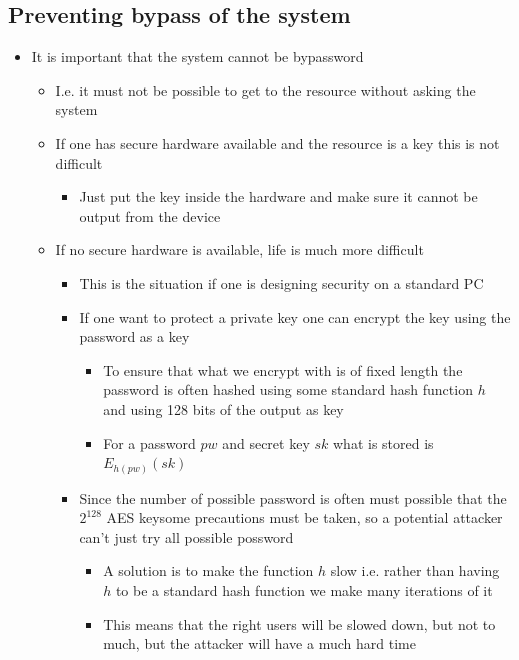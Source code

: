 \documentclass[11pt]{article}
\begin{document}
\subsection{Preventing bypass of the system}
\label{sec:orgcf8e36b}
\begin{itemize}
\item It is important that the system cannot be bypassword
\begin{itemize}
\item I.e. it must not be possible to get to the resource without asking the system
\item If one has secure hardware available and the resource is a key this is not difficult
\begin{itemize}
\item Just put the key inside the hardware and make sure it cannot be output from the device
\end{itemize}
\item If no secure hardware is available, life is much more difficult
\begin{itemize}
\item This is the situation if one is designing security on a standard PC
\item If one want to protect a private key one can encrypt the key using the password as a key
\begin{itemize}
\item To ensure that what we encrypt with is of fixed length the password is often hashed using some standard hash function \(h\) and using 128 bits of the output as key
\item For a password \(pw\) and secret key \(sk\) what is stored is \(E_{h(pw)}(sk)\)
\end{itemize}
\item Since the number of possible password is often must possible that the \(2^{128}\) AES keysome precautions must be taken, so a potential attacker can't just try all possible possword
\begin{itemize}
\item A solution is to make the function \(h\) slow i.e. rather than having \(h\) to be a standard hash function we make many iterations of it
\item This means that the right users will be slowed down, but not to much, but the attacker will have a much hard time
\end{itemize}
\end{itemize}
\end{itemize}
\end{itemize}
\end{document}

